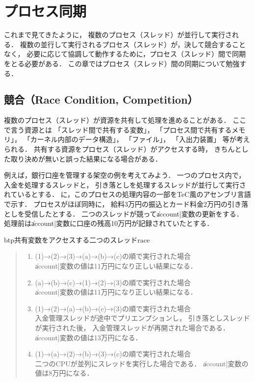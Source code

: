 \chapter{プロセス同期}
\label{synchronaization}
これまで見てきたように，
複数のプロセス（スレッド）が並行して実行される．
複数の並行して実行されるプロセス（スレッド）が，決して競合することなく，
必要に応じて協調して動作するために，プロセス（スレッド）間で同期をとる必要がある．
この章ではプロセス（スレッド）間の同期について勉強する．

\section{競合（Race Condition, Competition）}
複数のプロセス（スレッド）が資源を共有して処理を進めることがある．
ここで言う資源とは
「スレッド間で共有する変数」，
「プロセス間で共有するメモリ」，
「カーネル内部のデータ構造」，
「ファイル」，
「入出力装置」
等が考えられる．
共有する資源をプロセス（スレッド）がアクセスする時，
きちんとした取り決めが無いと誤った結果になる場合がある．

例えば，銀行口座を管理する架空の例を考えてみよう．
一つのプロセス内で，入金を処理するスレッドと，
引き落としを処理するスレッドが並行して実行されているとする．
に，このプロセスの処理内容の一部をTeC風のアセンブリ言語で示す．
プロセスがほぼ同時に，
給料3万円の振込とカード料金2万円の引き落としを受信したとする．
二つのスレッドが競って\|account|変数の更新をする．
処理前は\|account|変数に口座の残高10万円が記録されていたとする．

\begin{myfig}{btp}{共有変数をアクセスする二つのスレッド}{race}
  
\end{myfig}

\begin{quote}
  \begin{enumerate}
  \item (1)→(2)→(3)→(a)→(b)→(c)の順で実行された場合 \\
    \|account|変数の値は11万円になり正しい結果になる．

  \item (a)→(b)→(c)→(1)→(2)→(3)の順で実行された場合 \\
    \|account|変数の値は11万円になり正しい結果になる．

  \item (1)→(2)→(a)→(b)→(c)→(3)の順で実行された場合 \\
    入金管理スレッドが途中でプリエンプションし，
    引き落としスレッドが実行された後，
    入金管理スレッドが再開された場合である．
    \|account|変数の値は13万円になる．

  \item (1)→(a)→(2)→(b)→(3)→(c)の順で実行された場合 \\
    二つのCPUが並列にスレッドを実行した場合である．
    \|account|変数の値は8万円になる．
  \end{enumerate}
\end{quote}

